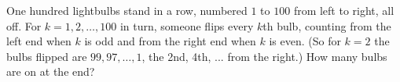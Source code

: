 One hundred lightbulbs stand in a row, numbered $1$ to $100$ from left to right, all off. For $k=1,2,\dots,100$ in turn, someone flips every $k$th bulb, counting from the left end when $k$ is odd and from the right end when $k$ is even. (So for $k=2$ the bulbs flipped are $99,97,\dots,1$, the 2nd, 4th, ... from the right.) How many bulbs are on at the end?

